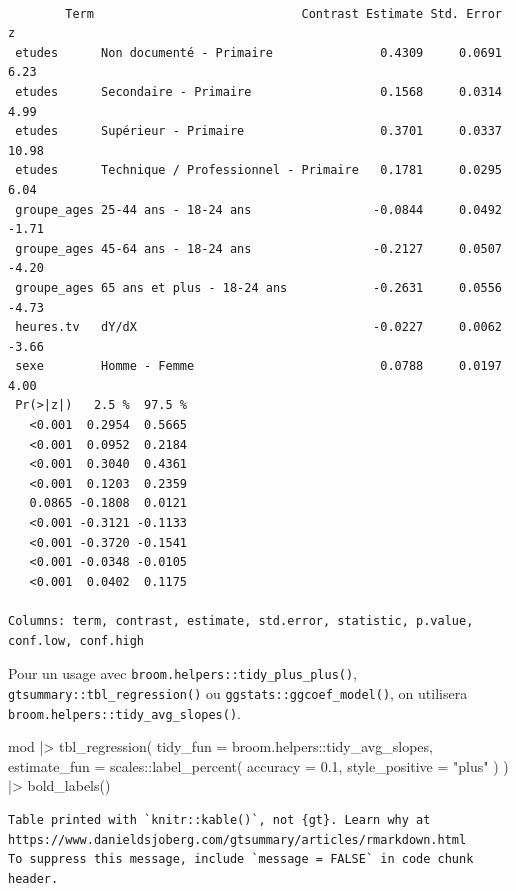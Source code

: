 \documentclass[
  letterpaper,
  DIV=11,
  numbers=noendperiod,
  oneside]{scrreprt}
\newenvironment{Shaded}{\begin{snugshade}}{\end{snugshade}}
\newcommand{\AttributeTok}[1]{\textcolor[rgb]{0.40,0.45,0.13}{#1}}
\newcommand{\FloatTok}[1]{\textcolor[rgb]{0.68,0.00,0.00}{#1}}
\newcommand{\FunctionTok}[1]{\textcolor[rgb]{0.28,0.35,0.67}{#1}}
\newcommand{\NormalTok}[1]{\textcolor[rgb]{0.00,0.23,0.31}{#1}}
\newcommand{\SpecialCharTok}[1]{\textcolor[rgb]{0.37,0.37,0.37}{#1}}
\newcommand{\StringTok}[1]{\textcolor[rgb]{0.13,0.47,0.30}{#1}}
\begin{document}
\begin{verbatim}

        Term                             Contrast Estimate Std. Error     z
 etudes      Non documenté - Primaire               0.4309     0.0691  6.23
 etudes      Secondaire - Primaire                  0.1568     0.0314  4.99
 etudes      Supérieur - Primaire                   0.3701     0.0337 10.98
 etudes      Technique / Professionnel - Primaire   0.1781     0.0295  6.04
 groupe_ages 25-44 ans - 18-24 ans                 -0.0844     0.0492 -1.71
 groupe_ages 45-64 ans - 18-24 ans                 -0.2127     0.0507 -4.20
 groupe_ages 65 ans et plus - 18-24 ans            -0.2631     0.0556 -4.73
 heures.tv   dY/dX                                 -0.0227     0.0062 -3.66
 sexe        Homme - Femme                          0.0788     0.0197  4.00
 Pr(>|z|)   2.5 %  97.5 %
   <0.001  0.2954  0.5665
   <0.001  0.0952  0.2184
   <0.001  0.3040  0.4361
   <0.001  0.1203  0.2359
   0.0865 -0.1808  0.0121
   <0.001 -0.3121 -0.1133
   <0.001 -0.3720 -0.1541
   <0.001 -0.0348 -0.0105
   <0.001  0.0402  0.1175

Columns: term, contrast, estimate, std.error, statistic, p.value, conf.low, conf.high 
\end{verbatim}

Pour un usage avec \texttt{broom.helpers::tidy\_plus\_plus()},
\texttt{gtsummary::tbl\_regression()} ou
\texttt{ggstats::ggcoef\_model()}, on utilisera
\texttt{broom.helpers::tidy\_avg\_slopes()}.

\begin{Shaded}
\begin{Highlighting}[]
\NormalTok{mod }\SpecialCharTok{|\textgreater{}} 
  \FunctionTok{tbl\_regression}\NormalTok{(}
    \AttributeTok{tidy\_fun =}\NormalTok{ broom.helpers}\SpecialCharTok{::}\NormalTok{tidy\_avg\_slopes,}
    \AttributeTok{estimate\_fun =}\NormalTok{ scales}\SpecialCharTok{::}\FunctionTok{label\_percent}\NormalTok{(}
      \AttributeTok{accuracy =} \FloatTok{0.1}\NormalTok{,}
      \AttributeTok{style\_positive =} \StringTok{"plus"}
\NormalTok{    )}
\NormalTok{  ) }\SpecialCharTok{|\textgreater{}} 
  \FunctionTok{bold\_labels}\NormalTok{()}
\end{Highlighting}
\end{Shaded}

\begin{verbatim}
Table printed with `knitr::kable()`, not {gt}. Learn why at
https://www.danieldsjoberg.com/gtsummary/articles/rmarkdown.html
To suppress this message, include `message = FALSE` in code chunk header.
\end{verbatim}
\end{document}
